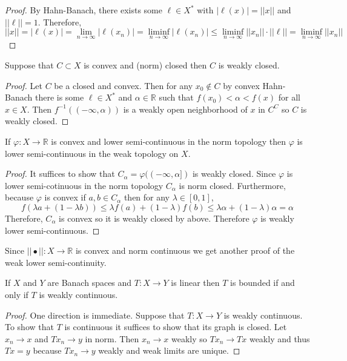 \documentclass[12pt]{article}
\newcommand{\R}{\mathbb{R}}
\begin{document}
\begin{proof}
By Hahn-Banach, there exists some $\ell \in X^*$ with $| \ell(x) | = || x ||$ and $|| \ell || = 1$. Therefore,
\[ || x || = | \ell(x) | = \lim_{n \to \infty} | \ell(x_n) | = \liminf_{n \to \infty} | \ell(x_n) | \le \liminf_{n \to \infty} || x_n || \cdot || \ell || = \liminf_{n \to \infty} || x_n || \]
\end{proof}

\begin{lemma}
Suppose that $C \subset X$ is convex and (norm) closed then $C$ is weakly closed.
\end{lemma}

\begin{proof}
Let $C$ be a closed and convex. Then for any $x_0 \notin C$ by convex Hahn-Banach there is some $\ell \in X^*$ and $\alpha \in \R$ such that $f(x_0) < \alpha < f(x)$ for all $x \in X$. Then $f^{-1}((-\infty, \alpha))$ is a weakly open neighborhood of $x$ in $C^C$ so $C$ is weakly closed.
\end{proof}

\begin{prop}
If $\varphi : X \to \R$ is convex and lower semi-continuous in the norm topology then $\varphi$ is lower semi-continuous in the weak topology on $X$.
\end{prop}

\begin{proof}
It suffices to show that $C_\alpha = \varphi((-\infty, \alpha])$ is weakly closed. Since $\varphi$ is lower semi-cotinuous in the norm topology $C_\alpha$ is norm closed. Furthermore, because $\varphi$ is convex if $a, b \in C_\alpha$ then for any $\lambda \in [0,1]$,
\[ f(\lambda a + (1 - \lambda b)) \le \lambda f(a) + (1 - \lambda) f(b) \le \lambda \alpha + (1 - \lambda) \alpha = \alpha \]
Therefore, $C_\alpha$ is convex so it is weakly closed by above. Therefore $\varphi$ is weakly lower semi-continuous.
\end{proof}

\begin{rmk}
Since $|| \bullet || : X \to \R$ is convex and norm continuous we get another proof of the weak lower semi-continuity.
\end{rmk}

\begin{prop}
If $X$ and $Y$ are Banach spaces and $T : X \to Y$ is linear then $T$ is bounded if and only if $T$ is weakly continuous.
\end{prop}

\begin{proof}
One direction is immediate. Suppose that $T : X \to Y$ is weakly continuous. To show that $T$ is continuous it suffices to show that its graph is closed. Let $x_n \to x$ and $T x_n \to y$ in norm. Then $x_n \to x$ weakly so $T x_n \to T x$ weakly and thus $T x = y$ because $T x_n \to y$ weakly and weak limits are unique.
\end{proof}
\end{document}
